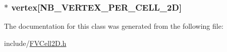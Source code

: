 \label{da/da3/classFVCell2D_a9edf0688f0159bed5d3a6828f63146fd}
\hypertarget{classFVCell2D_a43af246790b321630c5b93c98d944c4e}{
\subsubsection[{vertex}]{$\ast$ {\bf vertex}\mbox{[}NB\_\-VERTEX\_\-PER\_\-CELL\_\-2D\mbox{]}}}
\label{da/da3/classFVCell2D_a43af246790b321630c5b93c98d944c4e}


The documentation for this class was generated from the following file:\begin{DoxyCompactItemize}
\item 
include/\hyperlink{FVCell2D_8h}{FVCell2D.h}\end{DoxyCompactItemize}
